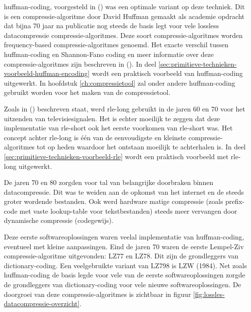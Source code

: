 \Gls{huffman-coding}, voorgesteld in   (\cite{huffman}) was een optimale variant op deze techniek. Dit is een \gls{compressie-algoritme} door David Huffman gemaakt als academie opdracht dat bijna 70 jaar na publicatie nog steeds de basis legt voor vele \gls{lossless} \gls{datacompressie} \glspl{compressie-algoritme}. Deze soort \glspl{compressie-algoritme} worden \gls{frequency-based} \glspl{compressie-algoritme} genoemd. Het exacte verschil tussen \gls{huffman-coding} en Shannon-Fano coding en meer informatie over deze \glspl{compressie-algoritme} zijn beschreven in  (\cite{lelewer87datacompression}). In deel \ref{sec:primitieve-technieken-voorbeeld-huffman-encoding} wordt een praktisch voorbeeld van \gls{huffman-coding} uitgewerkt. In hoofdstuk  \ref{ch:compressietool} zal onder andere \gls{huffman-coding} gebruikt worden voor het maken van de compressietool.

Zoals in  (\cite{robinson1967}) beschreven staat, werd \gls{rle-long} gebruikt in de jaren 60 en 70 voor het uitzenden van televisiesignalen. Het is echter moeilijk te zeggen dat deze implementatie van \gls{rle-short} ook het eerste voorkomen van \gls{rle-short} was. Het concept achter \gls{rle-long} is één van de eenvoudigste en kleinste \glspl{compressie-algoritme} tot op heden waardoor het ontstaan moeilijk te achterhalen is. In deel \ref{sec:primitieve-technieken-voorbeeld-rle} wordt een praktisch voorbeeld met \gls{rle-long} uitgewerkt.

De jaren 70 en 80 zorgden voor tal van belangrijke doorbraken binnen \gls{datacompressie}. Dit was te weiden aan de opkomst van het internet en de steeds groter wordende bestanden. Ook werd hardware matige compressie (zoals \gls{prefix-code} met vaste \gls{lookup-table} voor tekstbestanden) steeds meer vervangen door dynamische compressie (codegewijs). 

Deze eerste softwareoplossingen waren veelal implementatie van \gls{huffman-coding}, eventueel met kleine aanpassingen. Eind de jaren 70 waren de eerste Lempel-Ziv \gls{compressie-algoritme} uitgevonden: LZ77 en LZ78. Dit zijn de grondleggers van \gls{dictionary-coding}. Een veelgebruikte variant van LZ798 is LZW (1984). Net zoals \gls{huffman-coding} de basis legde voor vele van de eerste softwareoplossingen zorgde de grondleggers van \gls{dictionary-coding} voor vele nieuwe softwareoplossingen. De doorgroei van deze \glspl{compressie-algoritme} is zichtbaar in figuur \ref{fig:lossles-datacompressie-overzicht}.

